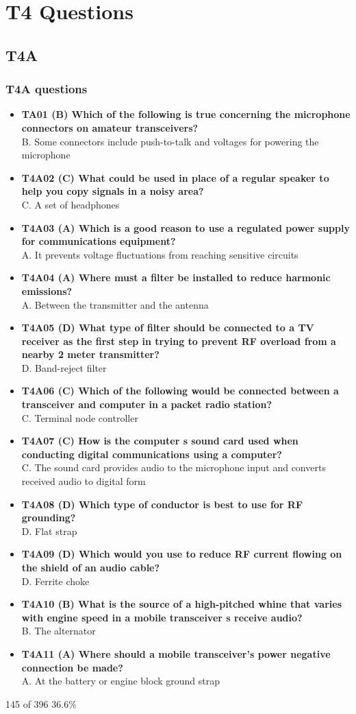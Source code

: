 \documentclass[10pt]{beamer}
\begin{document}
\section{T4 Questions}
\subsection{T4A}
\begin{frame}
\frametitle{T4A questions}
\begin{itemize}[<+->]
\tiny
\item\textbf{TA01 (B) Which of the following is true concerning the microphone connectors on amateur transceivers?}\\ B. Some connectors include push-to-talk and voltages for powering the microphone
\item\textbf{T4A02 (C) What could be used in place of a regular speaker to help you copy signals in a noisy area?}\\ C. A set of headphones
\item\textbf{T4A03 (A) Which is a good reason to use a regulated power supply for communications equipment?}\\ A. It prevents voltage fluctuations from reaching sensitive circuits
\item\textbf{T4A04 (A) Where must a filter be installed to reduce harmonic emissions?}\\ A. Between the transmitter and the antenna
\item\textbf{T4A05 (D) What type of filter should be connected to a TV receiver as the first step in trying to prevent RF overload from a nearby 2 meter transmitter?}\\ D. Band-reject filter
\item\textbf{T4A06 (C) Which of the following would be connected between a transceiver and computer in a packet radio station?}\\ C. Terminal node controller
\item\textbf{T4A07 (C) How is the computer s sound card used when conducting digital communications using a computer?}\\ C. The sound card provides audio to the microphone input and converts received audio to digital form
\item\textbf{T4A08 (D) Which type of conductor is best to use for RF grounding?}\\ D. Flat strap
\item\textbf{T4A09 (D) Which would you use to reduce RF current flowing on the shield of an audio cable?}\\ D. Ferrite choke
\item\textbf{T4A10 (B) What is the source of a high-pitched whine that varies with engine speed in a mobile transceiver s receive audio?}\\ B. The alternator
\item\textbf{T4A11 (A) Where should a mobile transceiver's power negative connection be made?}\\ A. At the battery or engine block ground strap
\end{itemize}
\tiny 145 of 396  36.6\%
\end{frame}
\end{document}
